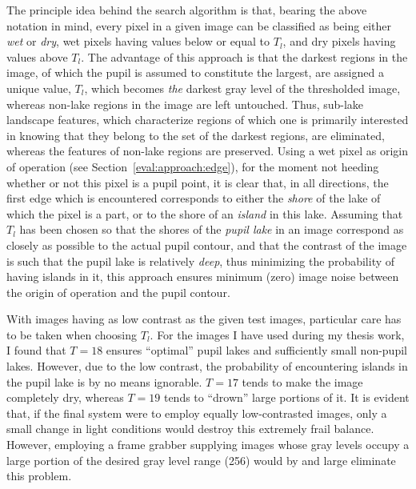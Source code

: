 The principle idea behind the search algorithm is that, bearing the
above notation in mind, every pixel in a given image can be classified
as being either {\em wet\/} or {\em dry\/}, wet pixels having values
below or equal to $T_{l}$, and dry pixels having values above $T_{l}$.
The advantage of this approach is that the darkest regions in the
image, of which the pupil is assumed to constitute the largest, are
assigned a unique value, $T_{l}$, which becomes {\em the\/} darkest
gray level of the thresholded image, whereas non-lake regions in the
image are left untouched.  Thus, sub-lake landscape features, which
characterize regions of which one is primarily interested in knowing
that they belong to the set of the darkest regions, are eliminated,
whereas the features of non-lake regions are preserved.  Using a wet
pixel as origin of operation (see Section~\ref{eval:approach:edge}),
for the moment not heeding whether or not this pixel is a pupil point,
it is clear that, in all directions, the first edge which is
encountered corresponds to either the {\em shore\/} of the lake of
which the pixel is a part, or to the shore of an {\em island\/} in
this lake.  Assuming that $T_{l}$ has been chosen so that the shores
of the {\em pupil lake\/} in an image correspond as closely as
possible to the actual pupil contour, and that the contrast of the
image is such that the pupil lake is relatively {\em deep\/}, thus
minimizing the probability of having islands in it, this approach
ensures minimum (zero) image noise between the origin of operation and
the pupil contour.

With images having as low contrast as the given test images,
particular care has to be taken when choosing $T_{l}$.  For the images
I have used during my thesis work, I found that $T=18$ ensures
``optimal'' pupil lakes and sufficiently small non-pupil lakes.
However, due to the low contrast, the probability of encountering
islands in the pupil lake is by no means ignorable.  $T=17$ tends to
make the image completely dry, whereas $T=19$ tends to ``drown'' large
portions of it.  It is evident that, if the final system were to
employ equally low-contrasted images, only a small change in light
conditions would destroy this extremely frail balance.  However,
employing a frame grabber supplying images whose gray levels occupy a
large portion of the desired gray level range (256) would by and large
eliminate this problem.



